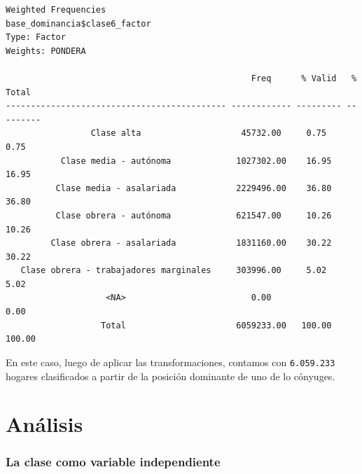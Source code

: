 \documentclass[
]{article}
\begin{document}
\begin{verbatim}
Weighted Frequencies  
base_dominancia$clase6_factor  
Type: Factor  
Weights: PONDERA  

                                                 Freq      % Valid   % Total 
-------------------------------------------- ------------ --------- ---------
                 Clase alta                    45732.00     0.75      0.75   
           Clase media - autónoma             1027302.00    16.95     16.95  
          Clase media - asalariada            2229496.00    36.80     36.80  
          Clase obrera - autónoma             621547.00     10.26     10.26  
         Clase obrera - asalariada            1831160.00    30.22     30.22  
   Clase obrera - trabajadores marginales     303996.00     5.02      5.02   
                    <NA>                         0.00                 0.00   
                   Total                      6059233.00   100.00    100.00  
\end{verbatim}

En este caso, luego de aplicar las transformaciones, contamos con \texttt{6.059.233} hogares clasificados a partir de la posición dominante de uno de lo cónyuges.

\hypertarget{part-anuxe1lisis}{%
\part{Análisis}\label{part-anuxe1lisis}}

\hypertarget{independiente}{%
\section{La clase como variable independiente}\label{independiente}}
\end{document}
